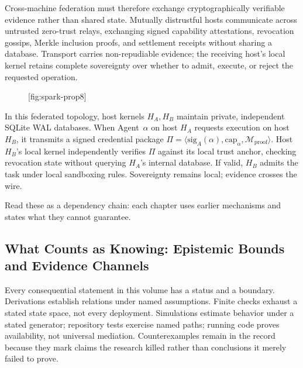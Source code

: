 Cross-machine federation must therefore exchange cryptographically verifiable evidence rather than shared state. Mutually distrustful hosts communicate across untrusted zero-trust relays, exchanging signed capability attestations, revocation gossips, Merkle inclusion proofs, and settlement receipts without sharing a database. Transport carries non-repudiable evidence; the receiving host's local kernel retains complete sovereignty over whether to admit, execute, or reject the requested operation.

\begin{figure}[tp]
  \centering
  [fig:spark-prop8]
\end{figure}

In this federated topology, host kernels $H_A, H_B$ maintain private, independent SQLite WAL databases. When Agent~$\alpha$ on host $H_A$ requests execution on host $H_B$, it transmits a signed credential package $\Pi = \langle \mathrm{sig}_A(\alpha), \mathrm{cap}_{\alpha}, \mathcal{M}_{\text{proof}} \rangle$. Host $H_B$'s local kernel independently verifies $\Pi$ against its local trust anchor, checking revocation state without querying $H_A$'s internal database. If valid, $H_B$ admits the task under local sandboxing rules. Sovereignty remains local; evidence crosses the wire.

Read these as a dependency chain: each chapter uses earlier mechanisms and
states what they cannot guarantee.

\subsection{What Counts as Knowing: Epistemic Bounds and Evidence Channels}
%
Every consequential statement in this volume has a status and a boundary. Derivations establish
relations under named assumptions. Finite checks exhaust a stated state space,
not every deployment. Simulations estimate behavior under a stated generator;
repository tests exercise named paths; running code proves availability, not
universal mediation. Counterexamples remain in the record because they mark
claims the research killed rather than conclusions it merely failed to prove.

